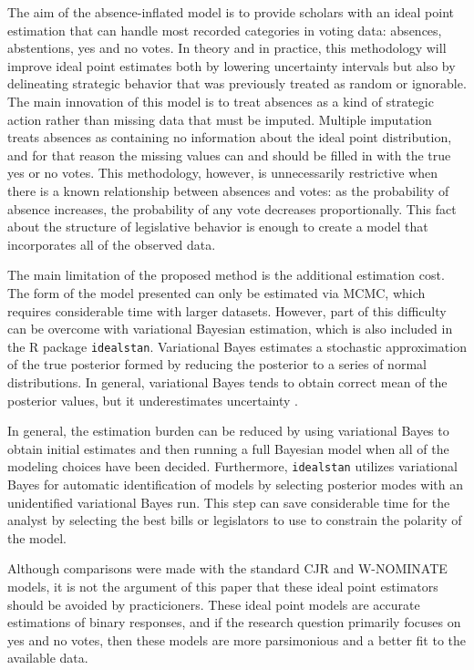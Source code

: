 	The aim of the absence-inflated model is to provide scholars with an ideal point estimation that can handle most recorded categories in voting data: absences, abstentions, yes and no votes. In theory and in practice, this methodology will improve ideal point estimates both by lowering uncertainty intervals but also by delineating strategic behavior that was previously treated as random or ignorable. The main innovation of this model is to treat absences as a kind of strategic action rather than missing data that must be imputed. Multiple imputation treats absences as containing no information about the ideal point distribution, and for that reason the missing values can and should be filled in with the true yes or no votes. This methodology, however, is unnecessarily restrictive when there is a known relationship between absences and votes: as the probability of absence increases, the probability of any vote decreases proportionally. This fact about the structure of legislative behavior is enough to create a model that incorporates all of the observed data. 
	
	The main limitation of the proposed method is the additional estimation cost. The form of the model presented can only be estimated via MCMC, which requires considerable time with larger datasets. However, part of this difficulty can be overcome with variational Bayesian estimation, which is also included in the R package \texttt{idealstan}. Variational Bayes estimates a stochastic approximation of the true posterior formed by reducing the posterior to a series of normal distributions. In general, variational Bayes tends to obtain correct mean of the posterior values, but it underestimates uncertainty \parencite{NIPS2015_5758}.
	
	In general, the estimation burden can be reduced by using variational Bayes to obtain initial estimates and then running a full Bayesian model when all of the modeling choices have been decided. Furthermore, \texttt{idealstan} utilizes variational Bayes for automatic identification of models by selecting posterior modes with an unidentified variational Bayes run. This step can save considerable time for the analyst by selecting the best bills or legislators to use to constrain the polarity of the model. 
	
	Although comparisons were made with the standard CJR and W-NOMINATE models, it is not the argument of this paper that these ideal point estimators should be avoided by practicioners. These ideal point models are accurate estimations of binary responses, and if the research question primarily focuses on yes and no votes, then these models are more parsimonious and a better fit to the available data.
	
